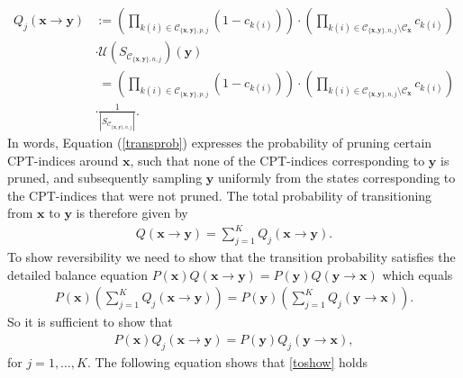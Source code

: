 \documentclass[a4paper, twoside, 11pt]{report}
\theoremstyle{plain}
\theoremstyle{definition}
\theoremstyle{remark}
\newcommand{\bfx}{{\mathbf{x}}}
\newcommand{\bfy}{{\mathbf{y}}}
\begin{document}
{\footnotesize \begin{align}\label{transprob}
{Q}_j (\mathbf{x} \to \mathbf{y}) &:= \left(\prod_{k(i) \in \mathcal{C}_{\{\mathbf{x}, \mathbf{y}\}, {p}, j} } (1-c_{k(i)}) \right) \cdot \left( \prod_{k(i) \in \mathcal{C}_{\{\mathbf{x}, \mathbf{y}\}, {n}, j} \setminus \mathcal{C}_{\mathbf{x}}  } c_{k(i)}   \right) \nonumber \\
& \cdot \mathcal{U}(S_{\mathcal{C}_{\{\mathbf{x}, \mathbf{y}\}, {n}, j}})(\mathbf{y}) \nonumber \nonumber \\ 
&\;=\left(\prod_{k(i) \in \mathcal{C}_{\{\mathbf{x}, \mathbf{y}\}, {p}, j} } (1-c_{k(i)}) \right)\cdot \left( \prod_{k(i) \in \mathcal{C}_{\{\mathbf{x}, \mathbf{y}\}, {n}, j} \setminus \mathcal{C}_{\mathbf{x}}  } c_{k(i)}   \right)  \nonumber \\
& \cdot \frac{1}{|S_{\mathcal{C}_{\{\mathbf{x}, \mathbf{y}\}, {n}, j}}|}.
\end{align}}
In words, Equation (\ref{transprob}) expresses the probability of pruning certain CPT-indices around $\bfx$, such that none of the CPT-indices corresponding to $\bfy$ is pruned, and subsequently sampling $\bfy$ uniformly from the states corresponding to the CPT-indices that were not pruned. The total probability of transitioning from $\bfx$ to $\bfy$ is therefore given by
\begin{align} \label{total}
{Q}(\mathbf{x} \to \mathbf{y}) = \sum_{j=1}^{K} {Q}_j (\mathbf{x} \to \mathbf{y}).
\end{align}
To show reversibility we need to show that the transition probability satisfies the detailed balance equation
$
P(\mathbf{x}) Q(\mathbf{x} \to \mathbf{y}) = P(\mathbf{y}) Q(\mathbf{y} \to \mathbf{x}) 
$
which equals
\begin{align*}
P(\mathbf{x}) \left(\sum_{j=1}^{K} {Q}_j (\mathbf{x} \to \mathbf{y}) \right) = P(\mathbf{y}) \left(\sum_{j=1}^{K} {Q}_j (\mathbf{y} \to \mathbf{x}) \right).
\end{align*}
So it is sufficient to show that
\begin{align} \label{toshow}
P(\mathbf{x}) {Q}_j (\mathbf{x} \to \mathbf{y}) = P(\mathbf{y})  {Q}_j (\mathbf{y} \to \mathbf{x}), 
\end{align}
for $j = 1, \ldots, K$. The following equation shows that \eqref{toshow} holds
\end{document}
